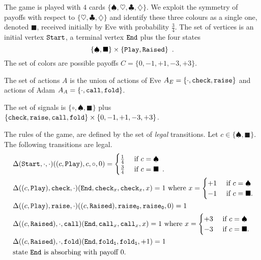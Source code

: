 The game is played with  $4$ cards $\{\spadesuit,\heartsuit,\clubsuit,\diamondsuit\}$.
We exploit the symmetry of payoffs with respect to $\{\heartsuit,\clubsuit,\diamondsuit\}$ and identify these three colours 
as a single one, denoted $\blacksquare$, received initially by Eve with probability $\frac{3}{4}$.
The set of vertices
is an initial vertex ${\tt Start}$,
a terminal vertex ${\tt End}$
plus the four states
\[
\{\spadesuit,\blacksquare\} \times 
 \{{\tt Play,Raised}\}\enspace.
 \]
The set of colors are possible payoffs $C=\{0,-1,+1,-3,+3\}$.

The set of actions $A$ 
is the union of 
actions of Eve 
$A_E=\{{\tt \cdot, check,raise}\}$
and actions of Adam
$A_A=\{{\tt \cdot, call, fold}\}$.

The set of signals is $\{\circ , \spadesuit, \blacksquare\}$ plus
$\{{\tt check},{\tt raise},{\tt call},{\tt fold}\}\times \{0,-1,+1,-3,+3\}$.

The rules of the game,
are defined by the set of \emph{legal} transitions.
Let $c \in \{\spadesuit,\blacksquare\}$.
The following transitions are legal.
\begin{align*}
&~\Delta({\tt Start},{\tt \cdot},{\tt \cdot})((c,{\tt Play}),c,\circ,0)=
\begin{cases}
\frac{1}{4}& \text{ if } c= \spadesuit\\
\frac{3}{4}& \text{ if } c= \blacksquare\enspace.
\end{cases}\\
&~\Delta((c,{\tt Play}),{\tt check},{\tt \cdot})({\tt End},{\tt check}_x,{\tt check}_x,x)=1
\text{ where } x=
\begin{cases}
+1 & \text{ if } c=\spadesuit\\
-1& \text{ if } c=\blacksquare.
\end{cases}
\\
&~\Delta((c,{\tt Play}),{\tt raise},{\tt \cdot})((c,{\tt Raised}),{\tt raise_0},{\tt raise_0},0)=1\\
&~\Delta((c,{\tt Raised}),{\tt \cdot},{\tt call})({\tt End},{\tt call}_x,{\tt call}_x,x)=1 
\text{ where } x=
\begin{cases}
+3 & \text{ if } c=\spadesuit\\
-3 & \text{ if } c=\blacksquare.
\end{cases}
\\
&~\Delta((c,{\tt Raised}),{\tt \cdot},{\tt fold})({\tt End},{\tt fold_1},{\tt fold_1},+1)=1\\
&~\text{state ${\tt End}$ is absorbing with payoff $0$.}
\end{align*}




